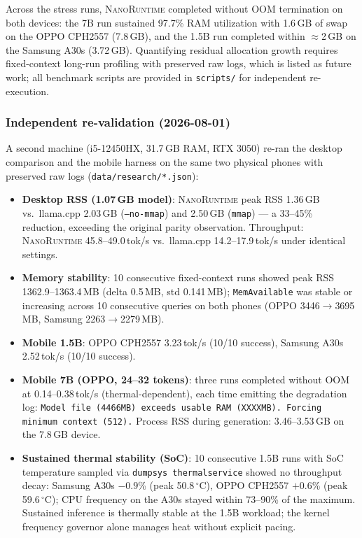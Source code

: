 \documentclass[11pt]{article}
\newcommand{\nanort}{\textsc{NanoRuntime}}
\begin{document}
Across the stress runs, \nanort{} completed without OOM termination on
both devices: the 7B run sustained 97.7\% RAM utilization with 1.6\,GB of
swap on the OPPO CPH2557 (7.8\,GB), and the 1.5B run completed within
$\approx$2\,GB on the Samsung A30s (3.72\,GB). Quantifying residual
allocation growth requires fixed-context long-run profiling with preserved
raw logs, which is listed as future work; all benchmark scripts are
provided in \texttt{scripts/} for independent re-execution.

\subsubsection*{Independent re-validation (2026-08-01)}

A second machine (i5-12450HX, 31.7\,GB RAM, RTX 3050) re-ran the desktop
comparison and the mobile harness on the same two physical phones with
preserved raw logs (\texttt{data/research/*.json}):

\begin{itemize}
  \item \textbf{Desktop RSS (1.07\,GB model)}: \nanort{} peak RSS
    1.36\,GB vs.\ llama.cpp 2.03\,GB (\texttt{--no-mmap}) and 2.50\,GB
    (\texttt{mmap}) --- a 33--45\% reduction, exceeding the original
    parity observation. Throughput: \nanort{} 45.8--49.0\,tok/s vs.\
    llama.cpp 14.2--17.9\,tok/s under identical settings.
  \item \textbf{Memory stability}: 10 consecutive fixed-context runs
    showed peak RSS 1362.9--1363.4\,MB (delta 0.5\,MB, std 0.141\,MB);
    \texttt{MemAvailable} was stable or increasing across 10 consecutive
    queries on both phones (OPPO 3446$\rightarrow$3695\,MB, Samsung
    2263$\rightarrow$2279\,MB).
  \item \textbf{Mobile 1.5B}: OPPO CPH2557 3.23\,tok/s (10/10 success),
    Samsung A30s 2.52\,tok/s (10/10 success).
  \item \textbf{Mobile 7B (OPPO, 24--32 tokens)}: three runs completed
    without OOM at 0.14--0.38\,tok/s (thermal-dependent), each time
    emitting the degradation log: \texttt{Model file (4466MB) exceeds
    usable RAM (XXXXMB). Forcing minimum context (512).} Process RSS
    during generation: 3.46--3.53\,GB on the 7.8\,GB device.
  \item \textbf{Sustained thermal stability (SoC)}: 10 consecutive 1.5B
    runs with SoC temperature sampled via \texttt{dumpsys thermalservice}
    showed no throughput decay: Samsung A30s $-0.9$\% (peak 50.8$\,^{\circ}$C),
    OPPO CPH2557 $+0.6$\% (peak 59.6$\,^{\circ}$C); CPU frequency on the
    A30s stayed within 73--90\% of the maximum. Sustained inference is
    thermally stable at the 1.5B workload; the kernel frequency governor
    alone manages heat without explicit pacing.
\end{itemize}
\end{document}
